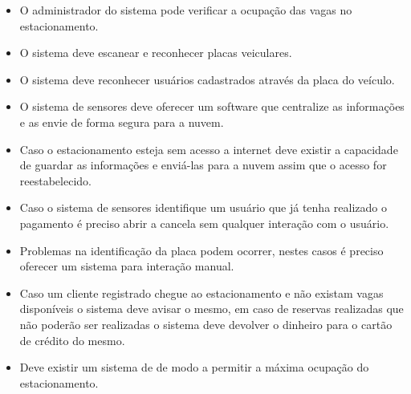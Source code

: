 \begin{itemize}
	\item O administrador do sistema pode verificar a ocupação das vagas no estacionamento.
	\item O sistema deve escanear e reconhecer placas veiculares.
	\item O sistema deve reconhecer usuários cadastrados através da placa do veículo.
	\item O sistema de sensores deve oferecer um software que centralize as informações e as envie de forma segura para a nuvem.
	\item Caso o estacionamento esteja sem acesso a internet deve existir a capacidade de guardar as informações e enviá-las para a nuvem assim que o acesso for reestabelecido.
	\item Caso o sistema de sensores identifique um usuário que já tenha realizado o pagamento é preciso abrir a cancela sem qualquer interação com o usuário.
	\item Problemas na identificação da placa podem ocorrer, nestes casos é preciso oferecer um sistema para interação manual.
	\item Caso um cliente registrado chegue ao estacionamento e não existam vagas disponíveis o sistema deve avisar o mesmo, em caso de reservas realizadas que não poderão ser realizadas o sistema deve devolver o dinheiro para o cartão de crédito do mesmo.
    \item Deve existir um sistema de  de modo a permitir a máxima ocupação do estacionamento.
\end{itemize}






